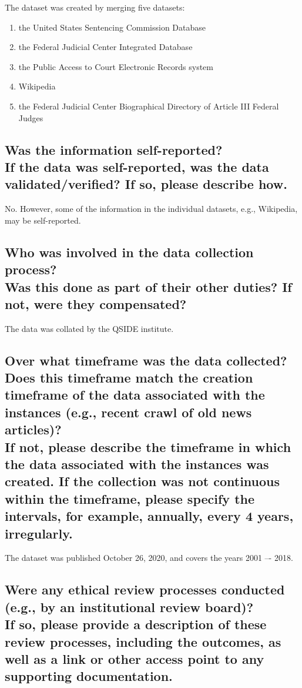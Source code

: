 \documentclass[letterpaper, 10 pt, conference]{ieeeconf}  %
\newcommand{\subtitle}[1]{{\\ \small \normalfont \color{purple} #1}}
\begin{document}
The dataset was created by merging five datasets:

\begin{enumerate}
    \item the United States Sentencing Commission Database
    \item the Federal Judicial Center Integrated Database
    \item the Public Access to Court Electronic Records system
    \item Wikipedia
    \item the Federal Judicial Center Biographical Directory of Article III Federal Judges
\end{enumerate}

\subsection{Was the information self-reported? \subtitle{If the data was self-reported, was the data validated/verified? If so, please describe how.}}

No. However, some of the information in the individual datasets, e.g., Wikipedia, may be self-reported.

\subsection{Who was involved in the data collection process? \subtitle{Was this done as part of their other duties? If not, were they compensated?}}

The data was collated by the QSIDE institute. 

\subsection{Over what timeframe was the data collected? Does this timeframe match the creation timeframe of the data associated with the instances (e.g., recent crawl of old news articles)? \subtitle{If not, please describe the timeframe in which the data associated with the instances was created. If the collection was not continuous within the timeframe, please specify the intervals, for example, annually, every 4 years, irregularly.}}

The dataset was published October 26, 2020, and covers the years 2001 –- 2018.

\subsection{Were any ethical review processes conducted (e.g., by an institutional review board)? \subtitle{If so, please provide a description of these review processes, including the outcomes, as well as a link or other access point to any supporting documentation.}}
\end{document}
